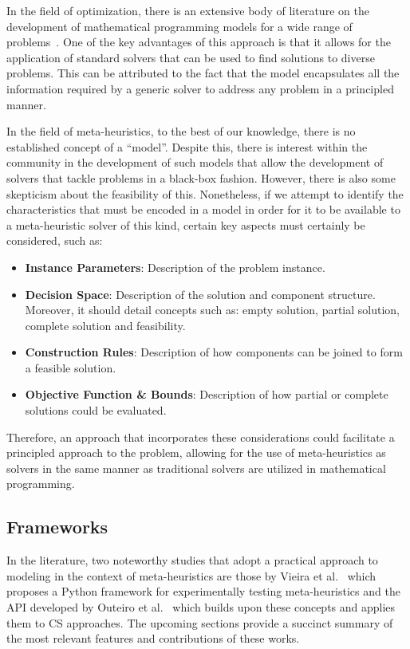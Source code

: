 In the field of optimization, there is an extensive body of literature on the
development of mathematical programming models for a wide range of
problems~\cite{papadimitriou1998combinatorial,nocedal2006numerical,williamson2011design}.
One of the key advantages of this approach is that it
allows for the application of standard solvers that can be used to find
solutions to diverse problems. This can be attributed to the fact that the model
encapsulates all the information required by a generic solver to address any
problem in a principled manner.

In the field of meta-heuristics, to the best of our knowledge, there is no
established concept of a ``model''. Despite this, there is interest within the
community in the development of such models that allow the development of
solvers that tackle problems in a black-box fashion. However, there is also some
skepticism about the feasibility of this. Nonetheless, if we attempt to identify
the characteristics that must be encoded in a model in order for it to be
available to a meta-heuristic solver of this kind, certain key aspects must
certainly be considered, such as:

\begin{itemize}
    \item \textbf{Instance Parameters}: Description of the problem instance.
    \item \textbf{Decision Space}: Description of the solution and component
          structure. Moreover, it should detail concepts such as: empty
          solution, partial solution, complete solution and feasibility.
    \item \textbf{Construction Rules}: Description of how components can be
          joined to form a feasible solution.
    \item \textbf{Objective Function \& Bounds}: Description of how partial or
          complete solutions could be evaluated.
\end{itemize}

Therefore, an approach that incorporates these considerations could facilitate a
principled approach to the problem, allowing for the use of meta-heuristics as
solvers in the same manner as traditional solvers are utilized in mathematical
programming.

\subsection{Frameworks}

In the literature, two noteworthy studies that adopt a practical approach to
modeling in the context of meta-heuristics are those by Vieira et
al.~\cite{vieira2009uma} which proposes a Python framework for experimentally
testing meta-heuristics and the API developed by Outeiro et
al.~\cite{outeiro2021application} which builds upon these concepts and applies
them to CS approaches. The upcoming sections provide a succinct summary of the
most relevant features and contributions of these works.

